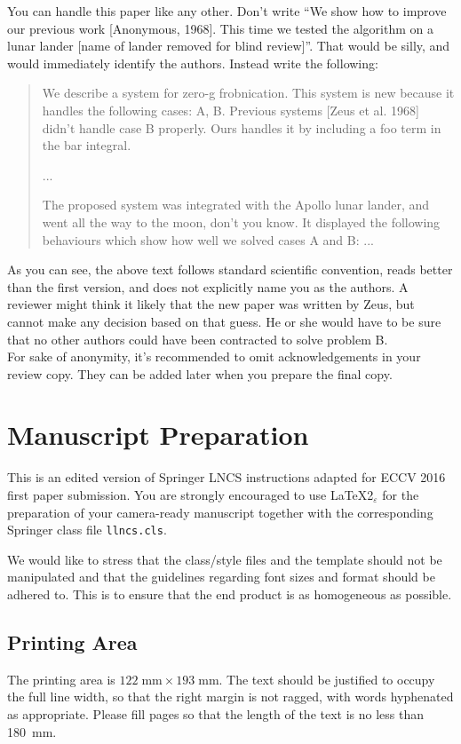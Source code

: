 \documentclass[runningheads]{llncs}
\begin{document}
You can handle this paper like any other.  Don't write ``We show how to
improve our previous work [Anonymous, 1968].  This time we tested the
algorithm on a lunar lander [name of lander removed for blind review]''.
That would be silly, and would immediately identify the authors. Instead
write the following:
\begin{quotation}
\noindent
   We describe a system for zero-g frobnication.  This
   system is new because it handles the following cases:
   A, B.  Previous systems [Zeus et al. 1968] didn't
   handle case B properly.  Ours handles it by including
   a foo term in the bar integral.

   ...

   The proposed system was integrated with the Apollo
   lunar lander, and went all the way to the moon, don't
   you know.  It displayed the following behaviours
   which show how well we solved cases A and B: ...
\end{quotation}
As you can see, the above text follows standard scientific convention,
reads better than the first version, and does not explicitly name you as
the authors.  A reviewer might think it likely that the new paper was
written by Zeus, but cannot make any decision based on that guess.
He or she would have to be sure that no other authors could have been
contracted to solve problem B. \\

For sake of anonymity, it's recommended to omit acknowledgements
in your review copy. They can be added later when you prepare the final copy.



\section{Manuscript Preparation}

This is an edited version of Springer LNCS instructions adapted
for ECCV 2016 first paper submission.
You are strongly encouraged to use \LaTeX2$_\varepsilon$ for the
preparation of your
camera-ready manuscript together with the corresponding Springer
class file \verb+llncs.cls+.

We would like to stress that the class/style files and the template
should not be manipulated and that the guidelines regarding font sizes
and format should be adhered to. This is to ensure that the end product
is as homogeneous as possible.

\subsection{Printing Area}
The printing area is $122  \; \mbox{mm} \times 193 \;
\mbox{mm}$.
The text should be justified to occupy the full line width,
so that the right margin is not ragged, with words hyphenated as
appropriate. Please fill pages so that the length of the text
is no less than 180~mm.
\end{document}
